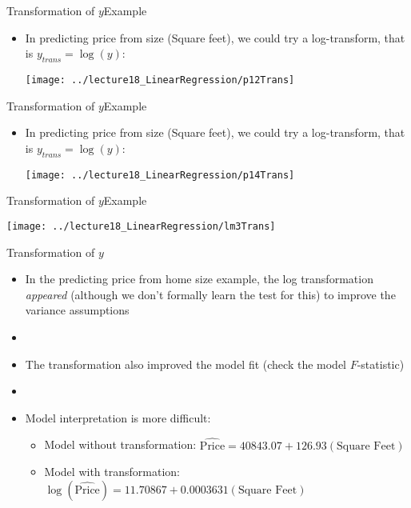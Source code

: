 \documentclass[xcolor=dvipsnames]{beamer}
\begin{document}
\begin{frame}{Transformation of $y$}{Example}
	\begin{itemize}
		\item In predicting price from size (Square feet), we could try a log-transform, that is $y_{trans} = \log(y)$: \pause
		\begin{center}
			\texttt{[image: ../lecture18\_LinearRegression/p12Trans]}
		\end{center}
	\end{itemize}
\end{frame}

\begin{frame}{Transformation of $y$}{Example}
	\begin{itemize}
		\item In predicting price from size (Square feet), we could try a log-transform, that is $y_{trans} = \log(y)$:
		\begin{center}
			\texttt{[image: ../lecture18\_LinearRegression/p14Trans]}
		\end{center}
	\end{itemize}
\end{frame}

\begin{frame}{Transformation of $y$}{Example}
	\begin{center}
		\texttt{[image: ../lecture18\_LinearRegression/lm3Trans]}
	\end{center}
\end{frame}

\begin{frame}{Transformation of $y$}
	\begin{itemize}
		\item In the predicting price from home size example, the log transformation \emph{appeared} (although we don't formally learn the test for this) to improve the variance assumptions \pause
		\item[]
		\item The transformation also improved the model fit (check the model $F$-statistic) \pause
		\item[]
		\item Model interpretation is more difficult: \pause
		\begin{itemize}
			\item Model without transformation: $\hat{\text{Price}} = 40843.07 + 126.93(\text{Square Feet})$ \pause
			\item Model with transformation: $\log(\hat{\text{Price}}) = 11.70867 + 0.0003631(\text{Square Feet})$
		\end{itemize}
	\end{itemize}
\end{frame}
\end{document}
